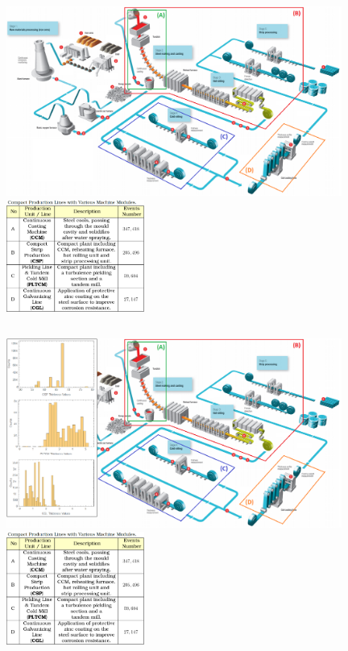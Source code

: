 \begin{frame}
	\begin{columns}[c]
		\hspace{-1.2cm}\includegraphics[width=11cm]{../images/steel-production-steps_old.png}
		\hspace{6cm}\includegraphics[height=3.7cm]{../tables/production_lines.png}
	\end{columns}
\end{frame}
\begin{frame}
	\begin{columns}[c]
		\hspace{-1.2cm}\includegraphics[width=11cm]{../tables/steel-production-steps_old_2.png}
		\hspace{6cm}\centering\includegraphics[height=3.7cm]{../tables/production_lines.png}
	\end{columns}
\end{frame}
